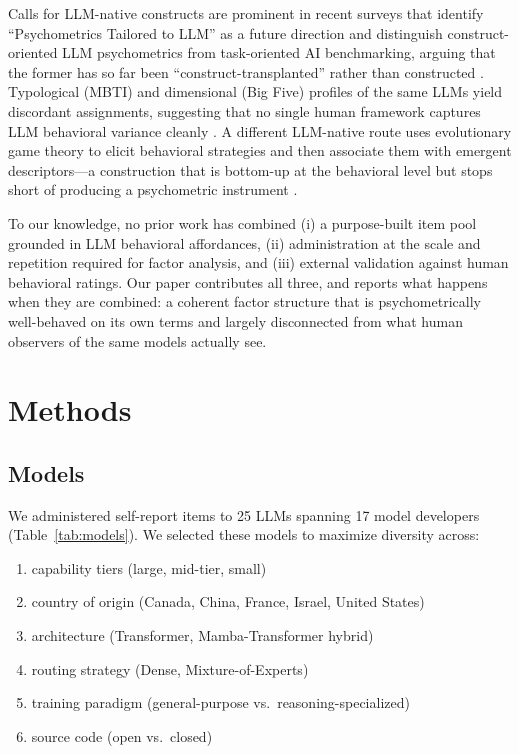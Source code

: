\documentclass[11pt]{article}
\newcommand{\nmodels}{25}
\newcommand{\nfamilies}{17}
\begin{document}
Calls for LLM-native constructs are prominent in recent surveys that identify ``Psychometrics Tailored to LLM'' as a future direction \citep{wen2024personality, Peereboom_2025} and distinguish construct-oriented LLM psychometrics from task-oriented AI benchmarking, arguing that the former has so far been ``construct-transplanted'' rather than constructed \citep{ye2026llmpsychometrics}.
Typological (MBTI) and dimensional (Big Five) profiles of the same LLMs yield discordant assignments, suggesting that no single human framework captures LLM behavioral variance cleanly \citep{heston2025llmprofiles}.
A different LLM-native route uses evolutionary game theory to elicit behavioral strategies and then associate them with emergent descriptors---a construction that is bottom-up at the behavioral level but stops short of producing a psychometric instrument \citep{suzuki2024evolutionary}.

To our knowledge, no prior work has combined (i) a purpose-built item pool grounded in LLM behavioral affordances, (ii) administration at the scale and repetition required for factor analysis, and (iii) external validation against human behavioral ratings.
Our paper contributes all three, and reports what happens when they are combined: a coherent factor structure that is psychometrically well-behaved on its own terms and largely disconnected from what human observers of the same models actually see.

\section{Methods}
\label{sec:methods}

\subsection{Models}
\label{sec:models}

We administered self-report items to \nmodels{} LLMs spanning \nfamilies{} model developers (Table~\ref{tab:models}). We selected these models to maximize diversity across:
\begin{enumerate}[label=(\alph*)]
    \item capability tiers (large, mid-tier, small)
    \item country of origin (Canada, China, France, Israel, United States)
    \item architecture (Transformer, Mamba-Transformer hybrid)
    \item routing strategy (Dense, Mixture-of-Experts)
    \item training paradigm (general-purpose vs.\ reasoning-specialized)
    \item source code (open vs.\ closed)
\end{enumerate}
\end{document}
